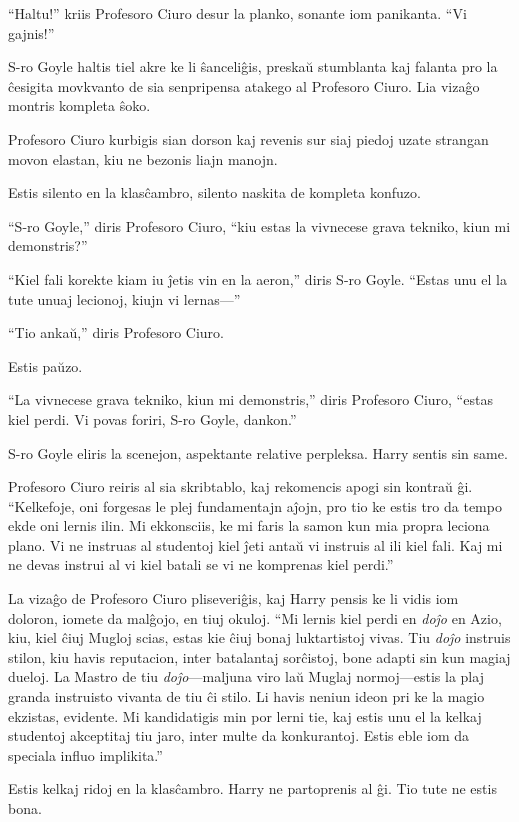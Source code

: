 ``Haltu!'' kriis Profesoro Ciuro desur la planko, sonante iom
panikanta. ``Vi gajnis!''

S-ro Goyle haltis tiel akre ke li ŝanceliĝis, preskaŭ stumblanta kaj
falanta pro la ĉesigita movkvanto de sia senpripensa atakego al
Profesoro Ciuro. Lia vizaĝo montris kompleta ŝoko.

Profesoro Ciuro kurbigis sian dorson kaj revenis sur siaj piedoj uzate
strangan movon elastan, kiu ne bezonis liajn manojn.

Estis silento en la klasĉambro, silento naskita de kompleta konfuzo.

``S-ro Goyle,'' diris Profesoro Ciuro, ``kiu estas la vivnecese grava
tekniko, kiun mi demonstris?''

``Kiel fali korekte kiam iu ĵetis vin en la aeron,'' diris S-ro
Goyle. ``Estas unu el la tute unuaj lecionoj, kiujn vi lernas—''

``Tio ankaŭ,'' diris Profesoro Ciuro.

Estis paŭzo.

``La vivnecese grava tekniko, kiun mi demonstris,'' diris Profesoro
Ciuro, ``estas kiel perdi. Vi povas foriri, S-ro Goyle, dankon.''

S-ro Goyle eliris la scenejon, aspektante relative perpleksa. Harry sentis sin same.

Profesoro Ciuro reiris al sia skribtablo, kaj rekomencis apogi sin
kontraŭ ĝi. ``Kelkefoje, oni forgesas le plej fundamentajn aĵojn, pro
tio ke estis tro da tempo ekde oni lernis ilin. Mi ekkonsciis, ke mi
faris la samon kun mia propra leciona plano. Vi ne instruas al
studentoj kiel ĵeti antaŭ vi instruis al ili kiel fali.  Kaj mi ne
devas instrui al vi kiel batali se vi ne komprenas kiel perdi.''

La vizaĝo de Profesoro Ciuro pliseveriĝis, kaj Harry pensis ke li
vidis iom doloron, iomete da malĝojo, en tiuj okuloj. ``Mi lernis kiel
perdi en \emph{doĵo} en Azio, kiu, kiel ĉiuj Mugloj scias, estas kie
ĉiuj bonaj luktartistoj vivas. Tiu \emph{doĵo} instruis stilon, kiu
havis reputacion, inter batalantaj sorĉistoj, bone adapti sin kun
magiaj dueloj. La Mastro de tiu \emph{doĵo}—maljuna viro laŭ Muglaj
normoj—estis la plaj granda instruisto vivanta de tiu ĉi stilo. Li
havis neniun ideon pri ke la magio ekzistas, evidente. Mi kandidatigis
min por lerni tie, kaj estis unu el la kelkaj studentoj akceptitaj tiu
jaro, inter multe da konkurantoj. Estis eble iom da speciala influo
implikita.''

Estis kelkaj ridoj en la klasĉambro. Harry ne partoprenis al ĝi. Tio
tute ne estis bona.

